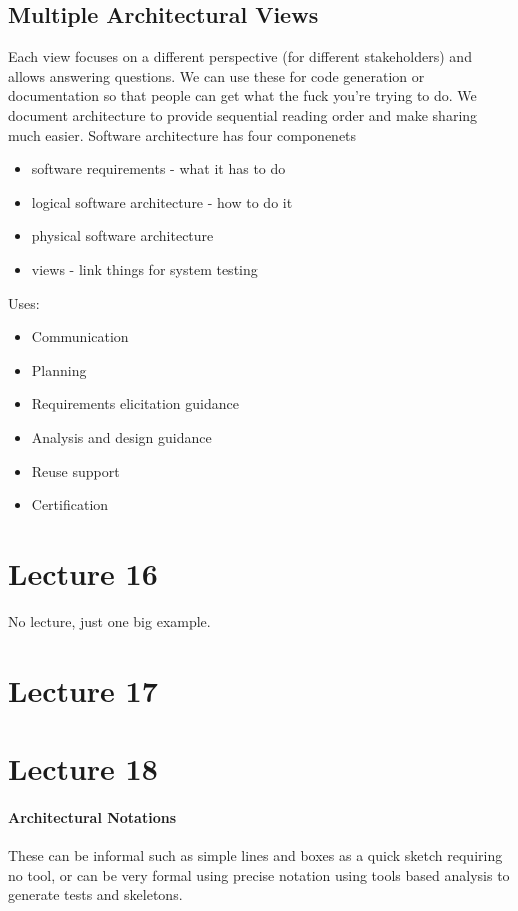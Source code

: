 \documentclass{article}
\begin{document}
\subsection*{Multiple Architectural Views} %
\label{sub:multiple_architectural_views}
Each view focuses on a different perspective (for different stakeholders) and allows answering questions. We can use these for code generation or documentation so that people can get what the fuck you're trying to do. We document architecture to provide sequential reading order and make sharing much easier. Software architecture has four componenets
\begin{itemize}
    \item software requirements - what it has to do
    \item logical software architecture - how to do it
    \item physical software architecture
    \item views - link things for system testing
\end{itemize}
Uses:
\begin{itemize}
    \item  Communication
    \item Planning
    \item Requirements elicitation guidance
    \item Analysis and design guidance
    \item Reuse support
    \item Certification
\end{itemize}

\section*{Lecture 16} %
\label{sec:lecture_16}
No lecture, just one big example.

\section*{Lecture 17} %
\label{sec:lecture_17}


\section*{Lecture 18} %
\label{sec:lecture_18}
\paragraph{Architectural Notations} %
\label{par:architectural_notations}
These can be informal such as simple lines and boxes as a quick sketch requiring no tool, or can be very formal using precise notation using tools based analysis to generate tests and skeletons.
\end{document}
